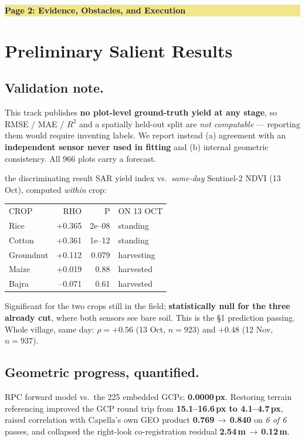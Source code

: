 \documentclass[9pt,a4paper,twocolumn]{extarticle}
\newcommand{\banner}[1]{%
  \vspace{2pt}\noindent\colorbox{khaki}{\parbox{\dimexpr\columnwidth-2\fboxsep}
  {\vspace{0.6pt}\bfseries\color{olive}#1\vspace{0.6pt}}}\vspace{1pt}}
\begin{document}
\newpage
\banner{Page 2: Evidence, Obstacles, and Execution}

\section{Preliminary Salient Results}

\subsection{Validation note.} This track publishes \textbf{no plot-level ground-truth yield at any
stage}, so RMSE / MAE / $R^2$ and a spatially held-out split are \emph{not computable} — reporting
them would require inventing labels. We report instead (a) agreement with an \textbf{independent
sensor never used in fitting} and (b) internal geometric consistency. All 966 plots carry a forecast.

\begin{callout}{the discriminating result}
SAR yield index vs.\ \emph{same-day} Sentinel-2 NDVI (13 Oct), computed \emph{within} crop:

\vspace{2pt}
{\fontsize{7.2}{8.4}\selectfont\ttfamily
\begin{tabular}{@{}lrrl@{}}
CROP      & RHO    & P        & ON 13 OCT\\[1pt]
Rice      & +0.365 & 2e--08   & standing\\
Cotton    & +0.361 & 1e--12   & standing\\
Groundnut & +0.112 & 0.079    & harvesting\\
Maize     & +0.019 & 0.88     & harvested\\
Bajra     & --0.071 & 0.61    & harvested\\
\end{tabular}}

\vspace{2.5pt}
Significant for the two crops still in the field; \textbf{statistically null for the three already
cut}, where both sensors see bare soil. This is the §1 prediction passing. Whole village, same day:
$\rho=+0.56$ (13 Oct, $n{=}923$) and $+0.48$ (12 Nov, $n{=}937$).
\end{callout}

\subsection{Geometric progress, quantified.} RPC forward model vs.\ the 225 embedded GCPs:
\textbf{0.0000\,px}. Restoring terrain referencing improved the GCP round trip from
\textbf{15.1–16.6\,px to 4.1–4.7\,px}, raised correlation with Capella's own GEO product
\textbf{0.769\,$\to$\,0.840} on \emph{6 of 6} passes, and collapsed the right-look co-registration
residual \textbf{2.54\,m\,$\to$\,0.12\,m}.
\end{document}
